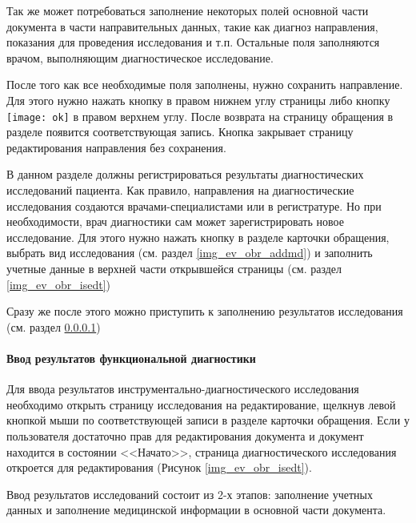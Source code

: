 {
{ 
Так же может потребоваться заполнение некоторых полей основной части документа в части направительных данных, такие как диагноз направления, показания для проведения исследования и т.п. Остальные поля заполняются врачом, выполняющим диагностическое исследование.

После того как все необходимые поля заполнены, нужно сохранить направление. Для этого нужно нажать кнопку  в правом нижнем углу страницы либо кнопку \texttt{[image: ok]} в правом верхнем углу. После возврата на страницу обращения в разделе  появится соответствующая запись. Кнопка  закрывает страницу редактирования направления без сохранения.
}
{
В данном разделе должны регистрироваться результаты диагностических исследований пациента. Как правило, направления на диагностические исследования создаются врачами-специалистами или в регистратуре. Но при необходимости, врач диагностики сам может зарегистрировать новое исследование. Для этого нужно нажать кнопку  в разделе  карточки обращения, выбрать вид исследования (см. раздел \ref{img_ev_obr_addmd}) и заполнить учетные данные в верхней части открывшейся страницы (см. раздел \ref{img_ev_obr_isedt}) 

Сразу же после этого можно приступить к заполнению результатов исследования (см. раздел \ref{ev_obr_isrez})
}

{
\paragraph{Ввод результатов функциональной диагностики} \label{ev_obr_isrez}

Для ввода результатов инструментально-диагностического исследования необходимо открыть страницу исследования на редактирование, щелкнув левой кнопкой мыши по соответствующей записи в разделе  карточки обращения. Если у пользователя достаточно прав для редактирования документа и документ находится в состоянии <<Начато>>, страница диагностического исследования откроется для редактирования (Рисунок \ref{img_ev_obr_isedt}). 

Ввод результатов исследований состоит из 2-х этапов: заполнение учетных данных и заполнение медицинской информации в основной части документа.

}}
